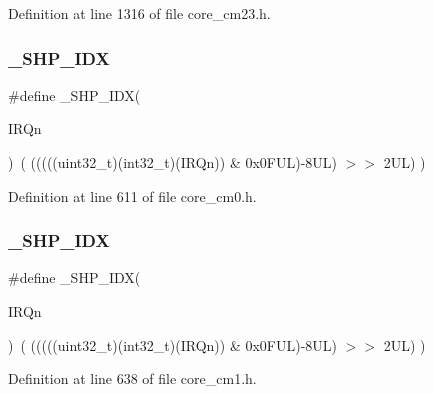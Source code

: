 Definition at line 1316 of file core\+\_\+cm23.\+h.

\mbox{\label{group___c_m_s_i_s___core___n_v_i_c_functions_gaee4f7eb5d7e770ad51489dbceabb1755}} 
\subsubsection{\texorpdfstring{\+\_\+\+S\+H\+P\+\_\+\+I\+DX}{\_SHP\_IDX}\hspace{0.1cm}{\footnotesize\ttfamily [1/6]}}
{\footnotesize\ttfamily \#define \+\_\+\+S\+H\+P\+\_\+\+I\+DX(\begin{DoxyParamCaption}\item[{}]{I\+R\+Qn }\end{DoxyParamCaption})~( (((((uint32\+\_\+t)(int32\+\_\+t)(I\+R\+Qn)) \& 0x0\+F\+U\+L)-\/8\+U\+L) $>$$>$    2\+U\+L)      )}



Definition at line 611 of file core\+\_\+cm0.\+h.

\mbox{\label{group___c_m_s_i_s___core___n_v_i_c_functions_gaee4f7eb5d7e770ad51489dbceabb1755}} 
\subsubsection{\texorpdfstring{\+\_\+\+S\+H\+P\+\_\+\+I\+DX}{\_SHP\_IDX}\hspace{0.1cm}{\footnotesize\ttfamily [2/6]}}
{\footnotesize\ttfamily \#define \+\_\+\+S\+H\+P\+\_\+\+I\+DX(\begin{DoxyParamCaption}\item[{}]{I\+R\+Qn }\end{DoxyParamCaption})~( (((((uint32\+\_\+t)(int32\+\_\+t)(I\+R\+Qn)) \& 0x0\+F\+U\+L)-\/8\+U\+L) $>$$>$    2\+U\+L)      )}



Definition at line 638 of file core\+\_\+cm1.\+h.

